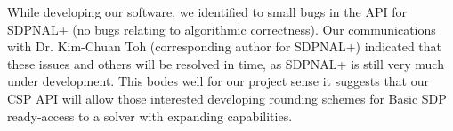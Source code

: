 \documentclass[12pt]{article} %
\begin{document}
While developing our software, we identified to small bugs in the API for SDPNAL+ (no bugs relating to algorithmic correctness). Our communications with Dr. Kim-Chuan Toh (corresponding author for SDPNAL+) indicated that these issues and others will be resolved in time, as SDPNAL+ is still very much under development. This bodes well for our project sense it suggests that our CSP API will allow those interested developing rounding schemes for Basic SDP ready-access to a solver with expanding capabilities.


\renewcommand{\bibname}{References}


\end{document}

